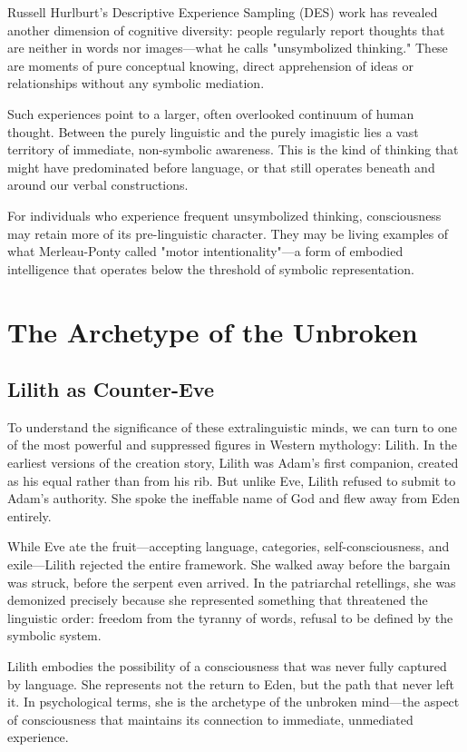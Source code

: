 Russell Hurlburt's Descriptive Experience Sampling (DES) work has revealed another dimension of cognitive diversity: people regularly report thoughts that are neither in words nor images—what he calls "unsymbolized thinking." These are moments of pure conceptual knowing, direct apprehension of ideas or relationships without any symbolic mediation.

Such experiences point to a larger, often overlooked continuum of human thought. Between the purely linguistic and the purely imagistic lies a vast territory of immediate, non-symbolic awareness. This is the kind of thinking that might have predominated before language, or that still operates beneath and around our verbal constructions.

For individuals who experience frequent unsymbolized thinking, consciousness may retain more of its pre-linguistic character. They may be living examples of what Merleau-Ponty called "motor intentionality"—a form of embodied intelligence that operates below the threshold of symbolic representation.

\section{The Archetype of the Unbroken}

\subsection{Lilith as Counter-Eve}

To understand the significance of these extralinguistic minds, we can turn to one of the most powerful and suppressed figures in Western mythology: Lilith. In the earliest versions of the creation story, Lilith was Adam's first companion, created as his equal rather than from his rib. But unlike Eve, Lilith refused to submit to Adam's authority. She spoke the ineffable name of God and flew away from Eden entirely.

While Eve ate the fruit—accepting language, categories, self-consciousness, and exile—Lilith rejected the entire framework. She walked away before the bargain was struck, before the serpent even arrived. In the patriarchal retellings, she was demonized precisely because she represented something that threatened the linguistic order: freedom from the tyranny of words, refusal to be defined by the symbolic system.

Lilith embodies the possibility of a consciousness that was never fully captured by language. She represents not the return to Eden, but the path that never left it. In psychological terms, she is the archetype of the unbroken mind—the aspect of consciousness that maintains its connection to immediate, unmediated experience.

